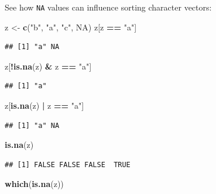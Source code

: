 \documentclass[12pt,]{book}
\newenvironment{Shaded}{\begin{snugshade}}{\end{snugshade}}
\newcommand{\KeywordTok}[1]{\textcolor[rgb]{0.13,0.29,0.53}{\textbf{#1}}}
\newcommand{\NormalTok}[1]{#1}
\newcommand{\OperatorTok}[1]{\textcolor[rgb]{0.81,0.36,0.00}{\textbf{#1}}}
\newcommand{\OtherTok}[1]{\textcolor[rgb]{0.56,0.35,0.01}{#1}}
\newcommand{\StringTok}[1]{\textcolor[rgb]{0.31,0.60,0.02}{#1}}
\begin{document}
See how \texttt{NA} values can influence
sorting character vectors:

\begin{Shaded}
\begin{Highlighting}[]
\NormalTok{z <-}\StringTok{ }\KeywordTok{c}\NormalTok{(}\StringTok{"b"}\NormalTok{, }\StringTok{"a"}\NormalTok{, }\StringTok{"c"}\NormalTok{, }\OtherTok{NA}\NormalTok{)}
\NormalTok{z[z }\OperatorTok{==}\StringTok{ "a"}\NormalTok{]}
\end{Highlighting}
\end{Shaded}

\begin{verbatim}
## [1] "a" NA
\end{verbatim}

\begin{Shaded}
\begin{Highlighting}[]
\NormalTok{z[}\OperatorTok{!}\KeywordTok{is.na}\NormalTok{(z) }\OperatorTok{&}\StringTok{ }\NormalTok{z }\OperatorTok{==}\StringTok{ "a"}\NormalTok{]}
\end{Highlighting}
\end{Shaded}

\begin{verbatim}
## [1] "a"
\end{verbatim}

\begin{Shaded}
\begin{Highlighting}[]
\NormalTok{z[}\KeywordTok{is.na}\NormalTok{(z) }\OperatorTok{|}\StringTok{ }\NormalTok{z }\OperatorTok{==}\StringTok{ "a"}\NormalTok{]}
\end{Highlighting}
\end{Shaded}

\begin{verbatim}
## [1] "a" NA
\end{verbatim}

\begin{Shaded}
\begin{Highlighting}[]
\KeywordTok{is.na}\NormalTok{(z)}
\end{Highlighting}
\end{Shaded}

\begin{verbatim}
## [1] FALSE FALSE FALSE  TRUE
\end{verbatim}

\begin{Shaded}
\begin{Highlighting}[]
\KeywordTok{which}\NormalTok{(}\KeywordTok{is.na}\NormalTok{(z))}
\end{Highlighting}
\end{Shaded}
\end{document}
